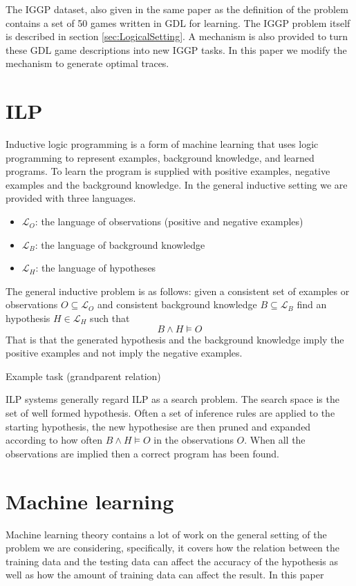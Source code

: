 The IGGP dataset, also given in the same paper as the definition of the problem contains a set of 50 games written in GDL for learning. The IGGP problem itself is described in section \ref{sec:LogicalSetting}. A mechanism is also provided to turn these GDL game descriptions into new IGGP tasks. In this paper we modify the mechanism to generate optimal traces.


\section{ILP}\label{sec:ILP}
Inductive logic programming is a form of machine learning that uses logic programming to represent examples, background knowledge, and learned programs\cite{Cropper/EfficientLearning}. To learn the program is supplied with positive examples, negative examples and the background knowledge. In the general inductive setting we are provided with three languages.
\begin{itemize}
\item $\mathcal{L}_O$: the language of observations (positive and negative examples)
\item $\mathcal{L}_B$: the language of background knowledge
\item $\mathcal{L}_H$: the language of hypotheses
\end{itemize}
The general inductive problem is as follows: given a consistent set of examples or observations $O \subseteq \mathcal{L}_O$ and consistent background knowledge $B \subseteq \mathcal{L}_B$ find an hypothesis $H \in \mathcal{L}_H$ such that \[B \wedge H \vDash O\] \cite{Muggleton/ILP}
That is that the generated hypothesis and the background knowledge imply the positive examples and not imply the negative examples.

Example task (grandparent relation)

ILP systems generally regard ILP as a search problem. The search space is the set of well formed hypothesis. Often a set of inference rules are applied to the starting hypothesis, the new hypothesise are then pruned and expanded according to how often $B \wedge H \vDash O$ in the observations $O$. When all the observations are implied then a correct program has been found.



\section{Machine learning}
Machine learning theory contains a lot of work on the general setting of the problem we are considering, specifically, it covers how the relation between the training data and the testing data can affect the accuracy of the hypothesis as well as how the amount of training data can affect the result. In this paper

